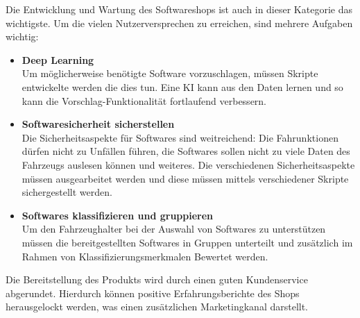 Die Entwicklung und Wartung des Softwareshops ist auch in dieser Kategorie das wichtigste. Um die vielen Nutzerversprechen zu erreichen, sind mehrere Aufgaben wichtig:
\begin{itemize}
	\item \textbf{Deep Learning\\}
	Um möglicherweise benötigte Software vorzuschlagen, müssen Skripte entwickelte werden die dies tun. Eine KI kann aus den Daten lernen und so kann die Vorschlag-Funktionalität fortlaufend verbessern.
	\item \textbf{Softwaresicherheit sicherstellen}\\
	Die Sicherheitsaspekte für Softwares sind weitreichend: Die Fahrunktionen dürfen nicht zu Unfällen führen, die Softwares sollen nicht zu viele Daten des Fahrzeugs auslesen können und weiteres. Die verschiedenen Sicherheitsaspekte müssen ausgearbeitet werden und diese müssen mittels verschiedener Skripte sichergestellt werden.
	
	\item \textbf{Softwares klassifizieren und gruppieren}\\
	Um den Fahrzeughalter bei der Auswahl von Softwares zu unterstützen müssen die bereitgestellten Softwares in Gruppen unterteilt und zusätzlich im Rahmen von Klassifizierungsmerkmalen Bewertet werden. 
\end{itemize}
Die Bereitstellung des Produkts wird durch einen guten Kundenservice abgerundet. Hierdurch können positive Erfahrungsberichte des Shops herausgelockt werden, was einen zusätzlichen Marketingkanal darstellt.

